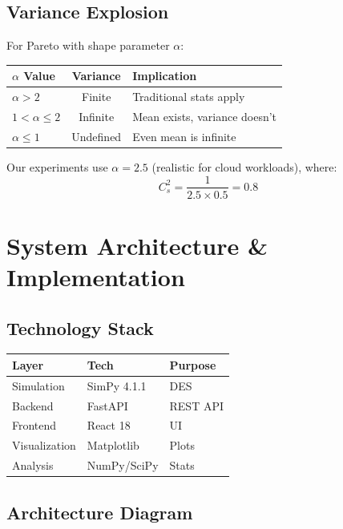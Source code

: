 \documentclass[11pt,a4paper]{article}
\begin{document}
\subsection{Variance Explosion}

For Pareto with shape parameter $\alpha$:

\begin{center}
\begin{tabular}{lcl}
\toprule
\textbf{$\alpha$ Value} & \textbf{Variance} & \textbf{Implication} \\
\midrule
$\alpha > 2$ & Finite & Traditional stats apply \\
$1 < \alpha \leq 2$ & Infinite & Mean exists, variance doesn't \\
$\alpha \leq 1$ & Undefined & Even mean is infinite \\
\bottomrule
\end{tabular}
\end{center}

Our experiments use $\alpha = 2.5$ (realistic for cloud workloads), where:
\begin{equation}
C_s^2 = \frac{1}{2.5 \times 0.5} = 0.8
\end{equation}


\section{System Architecture \& Implementation}

\subsection{Technology Stack}

\begin{table}[h]
\footnotesize
\begin{tabular}{lll}
\toprule
\textbf{Layer} & \textbf{Tech} & \textbf{Purpose} \\
\midrule
Simulation & SimPy 4.1.1 & DES \\
Backend & FastAPI & REST API \\
Frontend & React 18 & UI \\
Visualization & Matplotlib & Plots \\
Analysis & NumPy/SciPy & Stats \\
\bottomrule
\end{tabular}
\end{table}

\subsection{Architecture Diagram}
\end{document}
